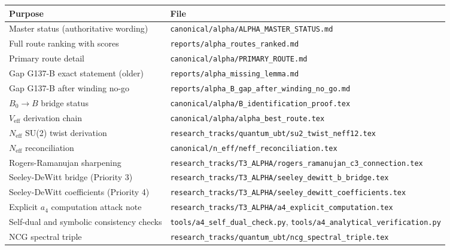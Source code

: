 \documentclass[12pt,a4paper]{article}
\theoremstyle{definition}
\theoremstyle{remark}
\begin{document}
\begin{center}
\begin{tabular}{ll}
\toprule
\textbf{Purpose} & \textbf{File} \\
\midrule
Master status (authoritative wording) &
  \texttt{canonical/alpha/ALPHA\_MASTER\_STATUS.md} \\
Full route ranking with scores &
  \texttt{reports/alpha\_routes\_ranked.md} \\
Primary route detail &
  \texttt{canonical/alpha/PRIMARY\_ROUTE.md} \\
Gap G137-B exact statement (older) &
  \texttt{reports/alpha\_missing\_lemma.md} \\
Gap G137-B after winding no-go &
  \texttt{reports/alpha\_B\_gap\_after\_winding\_no\_go.md} \\
$B_0\to B$ bridge status &
  \texttt{canonical/alpha/B\_identification\_proof.tex} \\
$V_{\mathrm{eff}}$ derivation chain &
  \texttt{canonical/alpha/alpha\_best\_route.tex} \\
$N_{\mathrm{eff}}$ SU(2) twist derivation &
  \texttt{research\_tracks/quantum\_ubt/su2\_twist\_neff12.tex} \\
$N_{\mathrm{eff}}$ reconciliation &
  \texttt{canonical/n\_eff/neff\_reconciliation.tex} \\
Rogers-Ramanujan sharpening &
  \texttt{research\_tracks/T3\_ALPHA/rogers\_ramanujan\_c3\_connection.tex} \\
Seeley-DeWitt bridge (Priority 3) &
  \texttt{research\_tracks/T3\_ALPHA/seeley\_dewitt\_b\_bridge.tex} \\
Seeley-DeWitt coefficients (Priority 4) &
  \texttt{research\_tracks/T3\_ALPHA/seeley\_dewitt\_coefficients.tex} \\
Explicit $a_4$ computation attack note &
  \texttt{research\_tracks/T3\_ALPHA/a4\_explicit\_computation.tex} \\
Self-dual and symbolic consistency checks &
  \texttt{tools/a4\_self\_dual\_check.py}, \texttt{tools/a4\_analytical\_verification.py} \\
NCG spectral triple &
  \texttt{research\_tracks/quantum\_ubt/ncg\_spectral\_triple.tex} \\
\bottomrule
\end{tabular}
\end{center}
\end{document}
